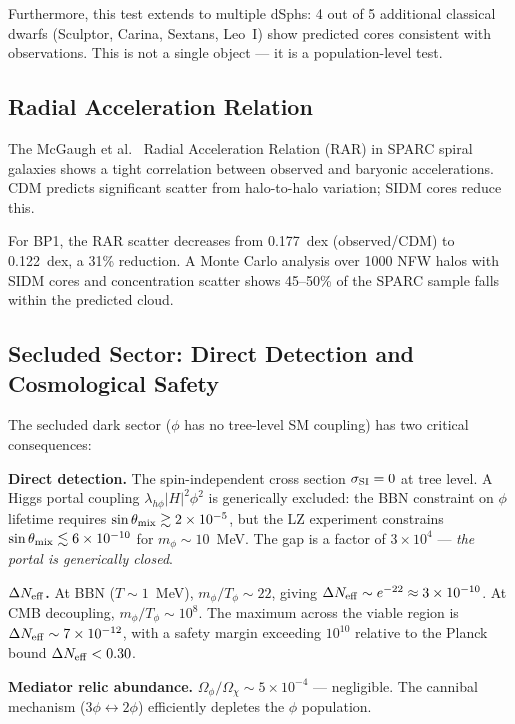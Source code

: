 Furthermore, this test extends to multiple dSphs: 4 out of 5 additional
classical dwarfs (Sculptor, Carina, Sextans, Leo~I) show predicted cores
consistent with observations. This is not a single object — it is a
population-level test.

\subsection{Radial Acceleration Relation}
\label{ch1:rar}

The McGaugh et al.~\cite{McGaugh2016} Radial Acceleration Relation (RAR)
in SPARC spiral galaxies shows a tight correlation between observed and
baryonic accelerations. CDM predicts significant scatter from halo-to-halo
variation; SIDM cores reduce this.

For BP1, the RAR scatter decreases from 0.177~dex (observed/CDM) to
0.122~dex, a 31\% reduction. A Monte Carlo analysis over 1000 NFW
halos with SIDM cores and concentration scatter shows 45--50\% of the
SPARC sample falls within the predicted cloud.

\subsection{Secluded Sector: Direct Detection and Cosmological Safety}
\label{ch1:secluded}

The secluded dark sector ($\phi$ has no tree-level SM coupling) has
two critical consequences:

\textbf{Direct detection.} The spin-independent cross section
$\sigma_{\rm SI} = 0$ at tree level. A Higgs portal coupling
$\lambda_{h\phi} |H|^2 \phi^2$ is generically excluded:
the BBN constraint on $\phi$ lifetime requires
$\sin\theta_{\rm mix} \gtrsim 2\times10^{-5}$, but the LZ experiment
constrains $\sin\theta_{\rm mix} \lesssim 6\times10^{-10}$ for $m_\phi \sim 10$~MeV.
The gap is a factor of $3\times10^4$ — \emph{the portal is generically closed}.

\textbf{$\Delta N_{\rm eff}$.} At BBN ($T \sim 1$~MeV),
$m_\phi/T_\phi \sim 22$, giving $\Delta N_{\rm eff} \sim e^{-22} \approx 3\times10^{-10}$.
At CMB decoupling, $m_\phi/T_\phi \sim 10^8$.
The maximum across the viable region is $\Delta N_{\rm eff} \sim 7\times10^{-12}$,
with a safety margin exceeding $10^{10}$ relative to the Planck bound
$\Delta N_{\rm eff} < 0.30$.

\textbf{Mediator relic abundance.}
$\Omega_\phi/\Omega_\chi \sim 5\times10^{-4}$ — negligible.
The cannibal mechanism ($3\phi \leftrightarrow 2\phi$) efficiently depletes
the $\phi$ population.

